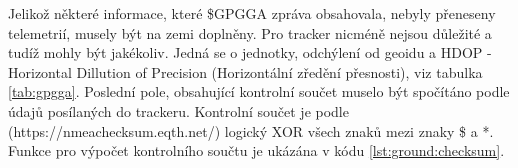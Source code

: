 \documentclass[twoside]{ctuthesis}
\theoremstyle{plain}
\theoremstyle{definition}
\theoremstyle{note}
\begin{document}
	

	

	Jelikož některé informace, které \$GPGGA zpráva obsahovala, nebyly přeneseny telemetrií, musely být na zemi doplněny. Pro tracker nicméně nejsou důležité a tudíž mohly být jakékoliv. Jedná se o jednotky, odchýlení od geoidu a HDOP - Horizontal Dillution of Precision (Horizontální zředění přesnosti), viz tabulka \ref{tab:gpgga}. Poslední pole, obsahující kontrolní součet muselo být spočítáno podle údajů posílaných do trackeru. Kontrolní součet je podle (https://nmeachecksum.eqth.net/) logický XOR všech znaků mezi znaky \$ a *. Funkce pro výpočet kontrolního součtu je ukázána v kódu \ref{lst:ground:checksum}.

	

\end{document}
